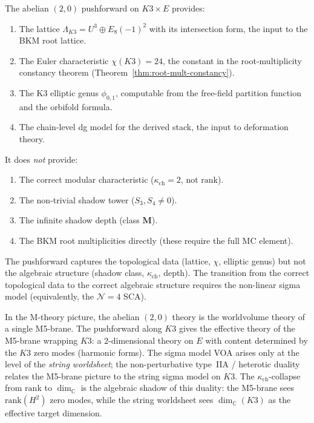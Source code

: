 \documentclass[11pt]{article}
\newcommand{\cN}{\mathcal{N}}
\newcommand{\C}{\mathbb{C}}
\begin{document}
\begin{observation}
\label{obs:topological-backbone}
The abelian $(2,0)$ pushforward on $K3 \times E$ provides:
\begin{enumerate}[label=\textup{(\roman*)}]
 \item The lattice $\Lambda_{K3} = U^3 \oplus E_8(-1)^2$ with its intersection form, the input to the BKM root lattice.
 \item The Euler characteristic $\chi(K3) = 24$, the constant in the root-multiplicity constancy theorem (Theorem~\ref{thm:root-mult-constancy}).
 \item The K3 elliptic genus $\phi_{0,1}$, computable from the free-field partition function and the orbifold formula.
 \item The chain-level dg model for the derived stack, the input to deformation theory.
\end{enumerate}
It does \emph{not} provide:
\begin{enumerate}[label=\textup{(\roman*)}, resume]
 \item The correct modular characteristic ($\kappa_{\mathrm{ch}} = 2$, not $\mathrm{rank}$).
 \item The non-trivial shadow tower ($S_3, S_4 \neq 0$).
 \item The infinite shadow depth (class $\mathbf{M}$).
 \item The BKM root multiplicities directly (these require the full MC element).
\end{enumerate}
The pushforward captures the topological data (lattice, $\chi$, elliptic genus) but not the algebraic structure (shadow class, $\kappa_{\mathrm{ch}}$, depth). The transition from the correct topological data to the correct algebraic structure requires the non-linear sigma model (equivalently, the $\cN = 4$ SCA).
\end{observation}

\begin{remark}
\label{rem:witten-m5}
In the M-theory picture, the abelian $(2,0)$ theory is the worldvolume theory of a single M5-brane. The pushforward along $K3$ gives the effective theory of the M5-brane wrapping $K3$: a $2$-dimensional theory on $E$ with content determined by the $K3$ zero modes (harmonic forms). The sigma model VOA arises only at the level of the \emph{string worldsheet}; the non-perturbative type~IIA / heterotic duality relates the M5-brane picture to the string sigma model on $K3$. The $\kappa_{\mathrm{ch}}$-collapse from $\mathrm{rank}$ to $\dim_\C$ is the algebraic shadow of this duality: the M5-brane sees $\mathrm{rank}(H^2)$ zero modes, while the string worldsheet sees $\dim_\C(K3)$ as the effective target dimension.
\end{remark}
\end{document}
